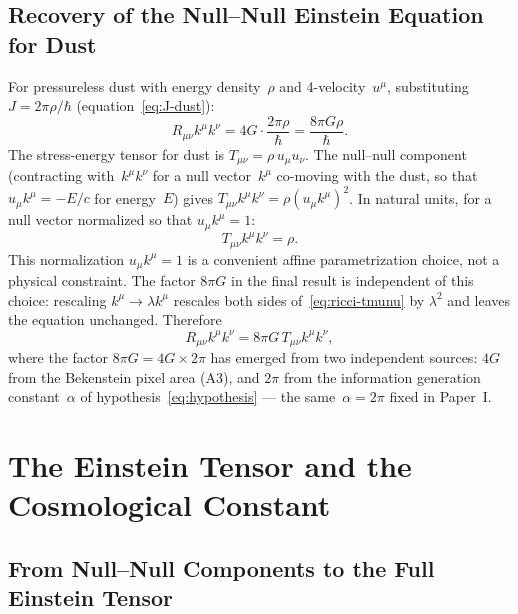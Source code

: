 \documentclass[12pt]{article}
\begin{document}
\subsection{Recovery of the Null--Null Einstein Equation for Dust}

For pressureless dust with energy density~$\rho$ and
4-velocity~$u^\mu$, substituting
$J = 2\pi\rho/\hbar$ (equation~\eqref{eq:J-dust}):
\begin{equation}
  R_{\mu\nu}k^\mu k^\nu
  = 4G \cdot \frac{2\pi\rho}{\hbar}
  = \frac{8\pi G\rho}{\hbar}.
  \label{eq:ricci-dust}
\end{equation}
The stress-energy tensor for dust is
$T_{\mu\nu} = \rho\,u_\mu u_\nu$.
The null--null component (contracting with~$k^\mu k^\nu$ for
a null vector~$k^\mu$ co-moving with the dust, so that
$u_\mu k^\mu = -E/c$ for energy~$E$) gives
$T_{\mu\nu}k^\mu k^\nu = \rho(u_\mu k^\mu)^2$.
In natural units, for a null vector normalized so that
$u_\mu k^\mu = 1$:
\begin{equation}
  T_{\mu\nu}k^\mu k^\nu = \rho.
  \label{eq:tmunu-null}
\end{equation}
This normalization $u_\mu k^\mu = 1$ is a convenient affine
parametrization choice, not a physical constraint.
The factor $8\pi G$ in the final result is independent of this
choice: rescaling $k^\mu \to \lambda k^\mu$ rescales both sides
of~\eqref{eq:ricci-tmunu} by $\lambda^2$ and leaves the equation
unchanged.
Therefore
\begin{equation}
  R_{\mu\nu}k^\mu k^\nu = 8\pi G\,T_{\mu\nu}k^\mu k^\nu,
  \label{eq:ricci-tmunu}
\end{equation}
where the factor $8\pi G = 4G \times 2\pi$ has emerged
from two independent sources: $4G$ from the Bekenstein
pixel area (A3), and $2\pi$ from the information generation
constant~$\alpha$ of hypothesis~\eqref{eq:hypothesis} ---
the same~$\alpha=2\pi$ fixed in Paper~I.

\section{The Einstein Tensor and the Cosmological Constant}
\label{sec:stress-energy}

\subsection{From Null--Null Components to the Full Einstein Tensor}
\end{document}

